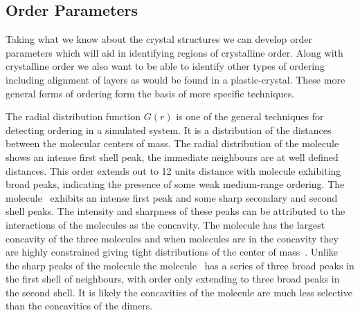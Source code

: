 \subsection{Order Parameters}

Taking what we know about the crystal structures we can develop order parameters which will aid in identifying regions of crystalline order. Along with crystalline order we also want to be able to identify other types of ordering including alignment of layers as would be found in a plastic-crystal. These more general forms of ordering form the basis of more specific techniques.

The radial distribution function $G(r)$ is one of the general techniques for detecting ordering in a simulated system. It is a distribution of the distances between the molecular centers of mass. The radial distribution of the \done molecule~ shows an intense first shell peak, the immediate neighbours are at well defined distances. This order extends out to 12 units distance with \done molecule exhibiting broad peaks, indicating the presence of some weak medium-range ordering. The \dcon molecule~ exhibits an intense first peak and some sharp secondary and second shell peaks. The intensity and sharpness of these peaks can be attributed to the interactions of the \dcon molecules as the concavity. The \dcon molecule has the largest concavity of the three molecules and when molecules are in the concavity they are highly constrained giving tight distributions of the center of mass~. Unlike the sharp peaks of the \dcon molecule the \tri molecule~ has a series of three broad peaks in the first shell of neighbours, with order only extending to three broad peaks in the second shell. It is likely the concavities of the \tri molecule are much less selective than the concavities of the dimers.

